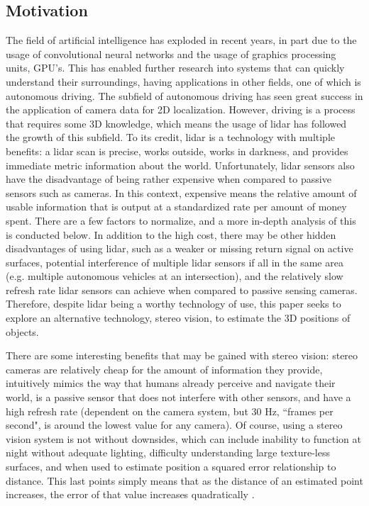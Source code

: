 \subsection{Motivation}
The field of artificial intelligence has exploded in recent years, in part due to the usage of convolutional neural networks and the usage of graphics processing units, GPU's. This has enabled further research into systems that can quickly understand their surroundings, having applications in other fields, one of which is autonomous driving. The subfield of autonomous driving has seen great success in the application of camera data for 2D localization. However, driving is a process that requires some 3D knowledge, which means the usage of lidar has followed the growth of this subfield. To its credit, lidar is a technology with multiple benefits: a lidar scan is precise, works outside, works in darkness, and provides immediate metric information about the world. Unfortunately, lidar sensors also have the disadvantage of being rather expensive when compared to passive sensors such as cameras. In this context, expensive means the relative amount of usable information that is output at a standardized rate per amount of money spent. There are a few factors to normalize, and a more in-depth analysis of this is conducted below. In addition to the high cost, there may be other hidden disadvantages of using lidar, such as a weaker or missing return signal on active surfaces, potential interference of multiple lidar sensors if all in the same area (e.g. multiple autonomous vehicles at an intersection), and the relatively slow refresh rate lidar sensors can achieve when compared to passive sensing cameras. Therefore, despite lidar being a worthy technology of use, this paper seeks to explore an alternative technology, stereo vision, to estimate the 3D positions of objects.


There are some interesting benefits that may be gained with stereo vision: stereo cameras are relatively cheap for the amount of information they provide, intuitively mimics the way that humans already perceive and navigate their world, is a passive sensor that does not interfere with other sensors, and have a high refresh rate (dependent on the camera system, but 30 Hz, ``frames per second", is around the lowest value for any camera). Of course, using a stereo vision system is not without downsides, which can include inability to function at night without adequate lighting, difficulty understanding large texture-less surfaces, and when used to estimate position a squared error relationship to distance. This last points simply means that as the distance of an estimated point increases, the error of that value increases quadratically \cite{wang_pseudo-lidar_2019}.

